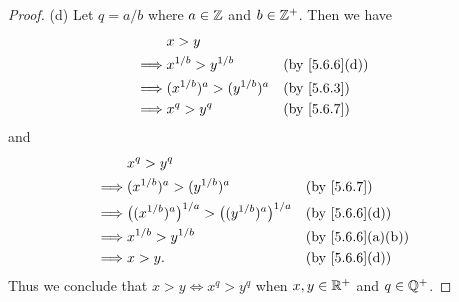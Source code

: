 \begin{proof}{(d)}
  Let \(q = a / b\) where \(a \in \mathbb{Z}\) and \(b \in \mathbb{Z}^+\).
  Then we have
  \begin{align*}
             & x > y                                            \\
    \implies & x^{1 / b} > y^{1 / b}         &  & \by{5.6.6}[d] \\
    \implies & (x^{1 / b})^a > (y^{1 / b})^a &  & \by{5.6.3}    \\
    \implies & x^q > y^q                     &  & \by{5.6.7}
  \end{align*}
  and
  \begin{align*}
             & x^q > y^q                                                                              \\
    \implies & (x^{1 / b})^a > (y^{1 / b})^a                                     &  & \by{5.6.7}      \\
    \implies & \big((x^{1 / b})^a\big)^{1 / a} > \big((y^{1 / b})^a\big)^{1 / a} &  & \by{5.6.6}[d]   \\
    \implies & x^{1 / b} > y^{1 / b}                                             &  & \by{5.6.6}[a,b] \\
    \implies & x > y.                                                            &  & \by{5.6.6}[d]
  \end{align*}
  Thus we conclude that \(x > y \iff x^q > y^q\) when \(x, y \in \mathbb{R}^+\) and \(q \in \mathbb{Q}^+\).
\end{proof}

